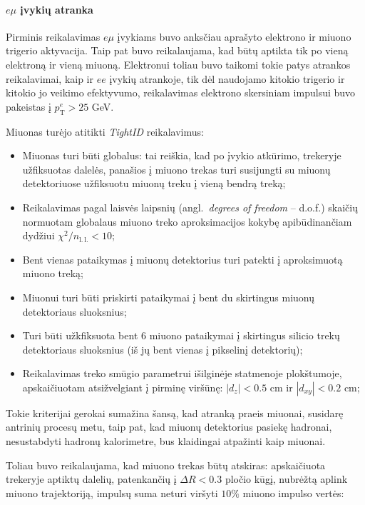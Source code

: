 \documentclass[a4paper, 12pt]{article}
\begin{document}
\paragraph{$e\mu$ įvykių atranka\\}

Pirminis reikalavimas $e\mu$ įvykiams buvo anksčiau aprašyto elektrono ir miuono trigerio aktyvacija. Taip pat buvo reikalaujama, kad būtų aptikta tik po vieną elektroną ir vieną miuoną. Elektronui toliau buvo taikomi tokie patys atrankos reikalavimai, kaip ir $ee$ įvykių atrankoje, tik dėl naudojamo kitokio trigerio ir kitokio jo veikimo efektyvumo, reikalavimas elektrono skersiniam impulsui buvo pakeistas į $p_{\mathrm{T}}^{e}>25$ GeV.

Miuonas turėjo atitikti \textit{TightID} \cite{TightMuon} reikalavimus:
\begin{itemize}
\item Miuonas turi būti globalus: tai reiškia, kad po įvykio atkūrimo, trekeryje užfiksuotas dalelės, panašios į miuono trekas turi susijungti su miuonų detektoriuose užfiksuotu miuonų treku į vieną bendrą treką;
\item Reikalavimas pagal laisvės laipsnių (angl.\ \textit{degrees of freedom} -- d.o.f.) skaičių normuotam globalaus miuono treko aproksimacijos kokybę apibūdinančiam dydžiui $\chi^{2}/n_{\mathrm{l. \, l.}}<10$;
\item Bent vienas pataikymas į miuonų detektorius turi patekti į aproksimuotą miuono treką;
\item Miuonui turi būti priskirti pataikymai į bent du skirtingus miuonų detektoriaus sluoksnius;
\item Turi būti užkfiksuota bent $6$ miuono pataikymai į skirtingus silicio trekų detektoriaus sluoksnius (iš jų bent vienas į pikselinį detektorių);
\item Reikalavimas treko smūgio parametrui išilginėje statmenoje plokštumoje, apskaičiuotam atsižvelgiant į pirminę viršūnę: $|d_{z}|<0.5$ cm ir $|d_{xy}|<0.2$ cm;
\end{itemize}
Tokie kriterijai gerokai sumažina šansą, kad atranką praeis miuonai, susidarę antrinių procesų metu, taip pat, kad miuonų detektorius pasiekę hadronai, nesustabdyti hadronų kalorimetre, bus klaidingai atpažinti kaip miuonai.

Toliau buvo reikalaujama, kad miuono trekas būtų atskiras: apskaičiuota trekeryje aptiktų dalelių, patenkančių į $\Delta R<0.3$ pločio kūgį, nubrėžtą aplink miuono trajektoriją, impulsų suma neturi viršyti $10\%$ miuono impulso vertės:
\end{document}
